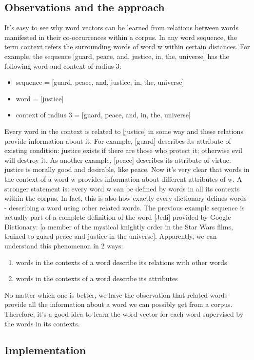 \documentclass{article}
\begin{document}
\subsection{Observations and the approach}
It's easy to see why word vectors can be learned from relations between words manifested in their co-occurrences within a corpus. In any word sequence, the term context refers the surrounding words of word w within certain distances. For example, the sequence [guard, peace, and, justice, in, the, universe] has the following word and context of radius 3:
\begin{itemize}
	\item sequence = [guard, peace, and, justice, in, the, universe]
	\item word = [justice]
	\item context of radius 3 = [guard, peace, and, in, the, universe]
\end{itemize}
Every word in the context is related to [justice] in some way and these relations provide information about it. For example, [guard] describes its attribute of existing condition: justice exists if there are those who protect it; otherwise evil will destroy it. As another example, [peace] describes its attribute of virtue: justice is morally good and desirable, like peace. Now it's very clear that words in the context of a word w provides information about different attributes of w. A stronger statement is: every word w can be defined by words in all its contexts within the corpus. In fact, this is also how exactly every dictionary defines words - describing a word using other related words. The previous example sequence is actually part of a complete definition of the word [Jedi] provided by Google Dictionary: [a member of the mystical knightly order in the Star Wars films, trained to guard peace and justice in the universe]. Apparently, we can understand this phenomenon in 2 ways:
\begin{enumerate}
	\item words in the contexts of a word describe its relations with other words
	\item words in the contexts of a word describe its attributes
\end{enumerate}
No matter which one is better, we have the observation that related words provide all the information about a word we can possibly get from a corpus. Therefore, it's a good idea to learn the word vector for each word supervised by the words in its contexts.

\subsection{Implementation}
\end{document}
